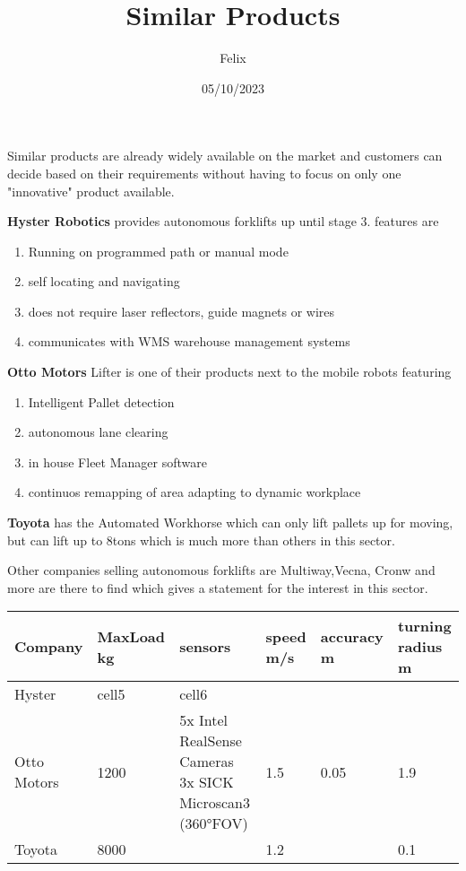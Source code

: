 \documentclass[11pt]{article}
\title{Similar Products}
\date{05/10/2023}
\author{Felix}
\begin{document}
\maketitle
Similar products are already widely available on the market and customers can decide based on their requirements
without having to focus on only one "innovative" product available.

\textbf{Hyster Robotics} provides autonomous forklifts up until stage 3.
features are 
\begin{enumerate}
    \item Running on programmed path or manual mode
    \item self locating and navigating
    \item does not require laser reflectors, guide magnets or wires
    \item communicates with WMS warehouse management systems 
\end{enumerate}

\textbf{Otto Motors} Lifter is one of their products next to the mobile robots featuring
\begin{enumerate}
    \item Intelligent Pallet detection
    \item autonomous lane clearing
    \item in house Fleet Manager software
    \item continuos remapping of area adapting to dynamic workplace
\end{enumerate}

\textbf{Toyota} has the Automated Workhorse which can only lift pallets up for moving, but 
can lift up to 8tons which is much more than others in this sector.

Other companies selling autonomous forklifts are Multiway,Vecna, Cronw and more are there to find 
which gives a statement for the interest in this sector. 

\begin{tabular}{ || p{2cm} || p{2cm} | p{3cm} | p{2cm} | p{2cm} | p{2cm} | } 
    \hline
    Company& MaxLoad kg & sensors & speed m/s & accuracy m & turning radius m \\ 
    \hline
    \hline
    Hyster & cell5 & cell6 & & & \\ 
    \hline
    Otto Motors & 1200 & 5x Intel RealSense Cameras 3x SICK Microscan3 (360°FOV)& 1.5 & 0.05 & 1.9\\ 
    \hline
    Toyota & 8000 & & 1.2 & &0.1\\
    \hline
  \end{tabular}
\end{document}
